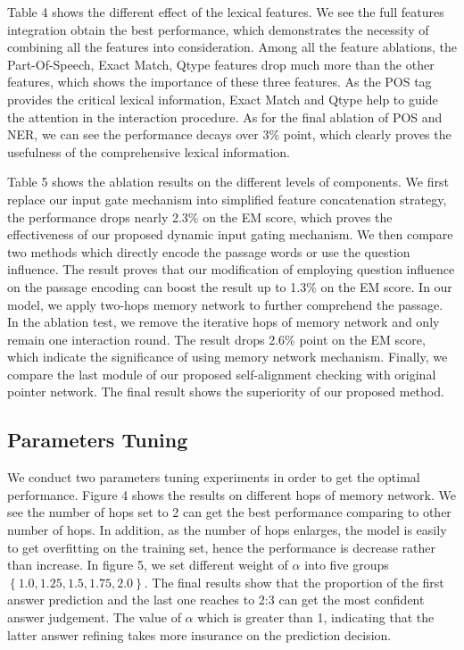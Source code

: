 \documentclass[letterpaper]{article} %
\begin{document}
Table 4 shows the different effect of the lexical features. We see the full features integration obtain the best performance, which demonstrates the necessity of combining all the features into consideration. Among all the feature ablations, the Part-Of-Speech, Exact Match, Qtype features drop much more than the other features, which shows the importance of these three features. As the POS tag provides the critical lexical information, Exact Match and Qtype help to guide the attention in the interaction procedure. As for the final ablation of POS and NER, we can see the performance decays over 3\% point, which clearly proves the usefulness of the comprehensive lexical information.   

Table 5 shows the ablation results on the different levels of components. We first replace our input gate mechanism into simplified feature concatenation strategy, the performance drops nearly 2.3\% on the EM score, which proves the effectiveness of our proposed dynamic input gating mechanism. We then compare two methods which directly encode the passage words or use the question influence. The result proves that our modification of employing question influence on the passage encoding can boost the result up to 1.3\% on the EM score. In our model, we apply two-hops memory network to further comprehend the passage. In the ablation test, we remove the iterative hops of memory network and only remain one interaction round. The result drops 2.6\% point on the EM score, which indicate the significance of using memory network mechanism. Finally, we compare the last module of our proposed self-alignment checking with original pointer network. The final result shows the superiority of our proposed method.

\subsection{Parameters Tuning}
We conduct two parameters tuning experiments in order to get the optimal performance. Figure 4 shows the results on different hops of memory network. We see the number of hops set to 2 can get the best performance comparing to other number of hops. In addition, as the number of hops enlarges, the model is easily to get overfitting on the training set, hence the performance is decrease rather than increase. In figure 5, we set different weight of $\alpha$ into five groups $\left\{1.0,1.25,1.5,1.75,2.0\right\}$. The final results show that the proportion of the first answer prediction and the last one reaches to 2:3 can get the most confident answer judgement. The value of $\alpha$ which is greater than 1, indicating that the latter answer refining takes more insurance on the prediction decision.
\end{document}
